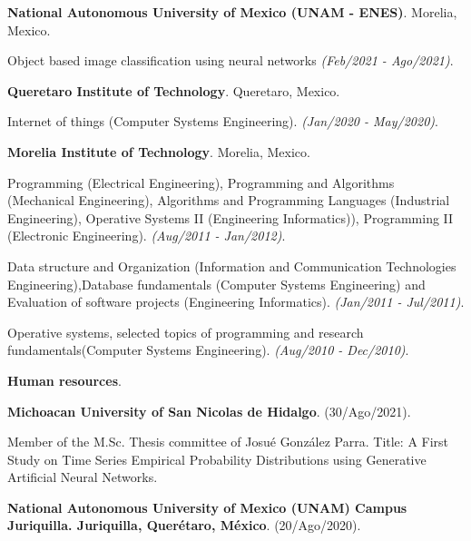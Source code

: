 \documentclass[10pt]{article}
\newenvironment{innerlist}[1][\enskip\textbullet]%
        {\begin{compactitem}[#1]}{\end{compactitem}}
\newcommand{\blankline}{\quad\pagebreak[2]}
\begin{document}
\blankline

\textbf{National Autonomous University of Mexico (UNAM - ENES)}. Morelia, Mexico.

\begin{innerlist}
\item Object based image classification using neural networks \textit{(Feb/2021 - Ago/2021)}.
\end{innerlist}

\blankline

\textbf{Queretaro Institute of Technology}. Queretaro, Mexico.

\begin{innerlist}
\item Internet of things (Computer Systems Engineering). \textit{(Jan/2020 - May/2020)}.
\end{innerlist}

\blankline

\textbf{Morelia Institute of Technology}. Morelia, Mexico.

\begin{innerlist}
\item Programming (Electrical Engineering), Programming and Algorithms (Mechanical Engineering), Algorithms and Programming Languages (Industrial Engineering), Operative Systems II (Engineering Informatics)), Programming II (Electronic Engineering). \textit{(Aug/2011  - Jan/2012)}.
\item Data structure and Organization (Information and Communication Technologies Engineering),Database fundamentals (Computer Systems Engineering) and Evaluation of software projects (Engineering Informatics). \textit{(Jan/2011 - Jul/2011)}.
\item Operative systems, selected topics of programming and research fundamentals(Computer Systems Engineering). \textit{(Aug/2010 - Dec/2010)}.
\end{innerlist}


\blankline

\textbf{Human resources}.

\blankline

\textbf{Michoacan University of San Nicolas de Hidalgo}. (30/Ago/2021).

Member of the M.Sc. Thesis committee of Josué González Parra.  
Title: A First Study on Time Series Empirical Probability Distributions using Generative Artificial Neural Networks. 


\blankline

\textbf{National Autonomous University of Mexico (UNAM) Campus Juriquilla. Juriquilla, Querétaro, México}. (20/Ago/2020).
\end{document}
